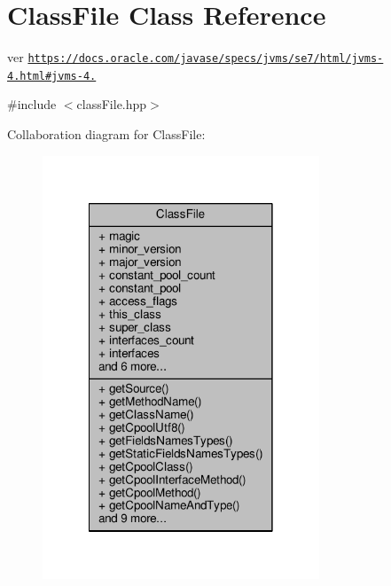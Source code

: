 \hypertarget{classClassFile}{\section{Class\+File Class Reference}
\label{classClassFile}
}


ver \href{https://docs.oracle.com/javase/specs/jvms/se7/html/jvms-4.html#jvms-4.4}{\tt https\+://docs.\+oracle.\+com/javase/specs/jvms/se7/html/jvms-\/4.\+html\#jvms-\/4.}  




{\ttfamily \#include $<$class\+File.\+hpp$>$}



Collaboration diagram for Class\+File\+:
\nopagebreak
\begin{figure}[H]
\begin{center}
\leavevmode
\includegraphics[width=234pt]{classClassFile__coll__graph}
\end{center}
\end{figure}
